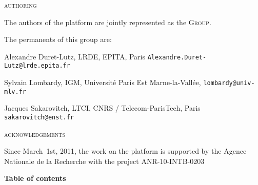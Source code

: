 \begin{center}
        \textsc{authoring}
    \end{center}

	\noindent 
The authors of the \vcsn platform are jointly represented  
 as the \vcsn \textsc{Group}.

 \bigskip
The permanents of this group are:

\medskip
	\noindent 
Alexandre Duret-Lutz, LRDE, EPITA, Paris 
\PushLine 
{\tt Alexandre.Duret-Lutz@lrde.epita.fr}

	\noindent 
Sylvain Lombardy, IGM, Universit\'e Paris Est Marne-la-Vall\'ee,
\PushLine 
 {\tt lombardy@univ-mlv.fr}
 
	\noindent 
Jacques Sakarovitch, LTCI, CNRS / Telecom-ParisTech, Paris 
\PushLine 
 {\tt sakarovitch@enst.fr}
 
\vspace*{20pt}

\begin{center}
        \textsc{acknowledgements}
    \end{center}

 Since March~1st, 2011, the work on the \vcsn platform is supported by 
 the Agence Nationale de la Recherche with the project ANR-10-INTB-0203 

\vspace*{20pt}

\newpage
\begin{center}
    {\Large \textbf{Table of contents}}
\end{center}

\makeatletter
{}
\makeatother



\endinput 


